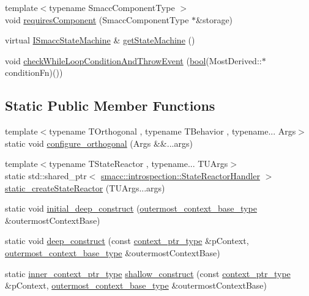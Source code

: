 \begin{DoxyCompactItemize}
\item 
{\footnotesize template$<$typename Smacc\+Component\+Type $>$ }\\void \hyperlink{classsmacc_1_1SmaccState_a2febb778d5c3d80b9c034576b5a92b65}{requires\+Component} (Smacc\+Component\+Type $\ast$\&storage)
\item 
virtual \hyperlink{classsmacc_1_1ISmaccStateMachine}{I\+Smacc\+State\+Machine} \& \hyperlink{classsmacc_1_1SmaccState_afc39f8e0ca4001b2159a100da2fccd0e}{get\+State\+Machine} ()
\item 
void \hyperlink{classsmacc_1_1SmaccState_a80082718f226bebedb589f0c4696001d}{check\+While\+Loop\+Condition\+And\+Throw\+Event} (\hyperlink{classbool}{bool}(Most\+Derived\+::$\ast$condition\+Fn)())
\end{DoxyCompactItemize}
\subsection*{Static Public Member Functions}
\begin{DoxyCompactItemize}
\item 
{\footnotesize template$<$typename T\+Orthogonal , typename T\+Behavior , typename... Args$>$ }\\static void \hyperlink{classsmacc_1_1SmaccState_acc54b973834c91d6ea1fad58ccecc97b}{configure\+\_\+orthogonal} (Args \&\&...args)
\item 
{\footnotesize template$<$typename T\+State\+Reactor , typename... T\+U\+Args$>$ }\\static std\+::shared\+\_\+ptr$<$ \hyperlink{classsmacc_1_1introspection_1_1StateReactorHandler}{smacc\+::introspection\+::\+State\+Reactor\+Handler} $>$ \hyperlink{classsmacc_1_1SmaccState_aa6e6b0d4491f88efc301e7ff917e6194}{static\+\_\+create\+State\+Reactor} (T\+U\+Args...\+args)
\item 
static void \hyperlink{classsmacc_1_1SmaccState_af4b4635d16a32bdd3956e5d40ddbd01d}{initial\+\_\+deep\+\_\+construct} (\hyperlink{classsmacc_1_1SmaccState_aaf76bbe2aa9dd73e3284605f84ab4b16}{outermost\+\_\+context\+\_\+base\+\_\+type} \&outermost\+Context\+Base)
\item 
static void \hyperlink{classsmacc_1_1SmaccState_aac23d8a6909f75c5e5fca2a7c09b5368}{deep\+\_\+construct} (const \hyperlink{classsmacc_1_1SmaccState_a0e15b77514301039f6bc093a9d3f6425}{context\+\_\+ptr\+\_\+type} \&p\+Context, \hyperlink{classsmacc_1_1SmaccState_aaf76bbe2aa9dd73e3284605f84ab4b16}{outermost\+\_\+context\+\_\+base\+\_\+type} \&outermost\+Context\+Base)
\item 
static \hyperlink{classsmacc_1_1SmaccState_a65a772c2e2039e9a59148ba6ffb54d8a}{inner\+\_\+context\+\_\+ptr\+\_\+type} \hyperlink{classsmacc_1_1SmaccState_a1dccb401e1a99031863a21a590d953e6}{shallow\+\_\+construct} (const \hyperlink{classsmacc_1_1SmaccState_a0e15b77514301039f6bc093a9d3f6425}{context\+\_\+ptr\+\_\+type} \&p\+Context, \hyperlink{classsmacc_1_1SmaccState_aaf76bbe2aa9dd73e3284605f84ab4b16}{outermost\+\_\+context\+\_\+base\+\_\+type} \&outermost\+Context\+Base)
\end{DoxyCompactItemize}
